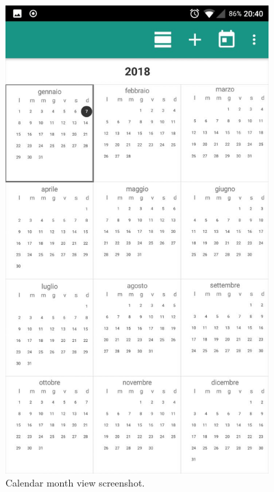 \begin{figure}
	\centering
	\includegraphics[width=4in]{./screenshots/Androidmonthview.png}
	\caption{Calendar month view screenshot.}
	\label{fig:droidmonthview}
\end{figure}

